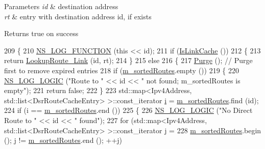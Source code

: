 \begin{DoxyParams}{Parameters}
{\em id} & destination address \\
\hline
{\em rt} & entry with destination address id, if exists \\
\hline
\end{DoxyParams}
\begin{DoxyReturn}{Returns}
true on success 
\end{DoxyReturn}

\begin{DoxyCode}
209 \{
210   \hyperlink{log-macros-disabled_8h_a90b90d5bad1f39cb1b64923ea94c0761}{NS\_LOG\_FUNCTION} (\textcolor{keyword}{this} << \textcolor{keywordtype}{id});
211   \textcolor{keywordflow}{if} (\hyperlink{classns3_1_1dsr_1_1DsrRouteCache_a3ec7cfaaf07c337cf71aa21793059293}{IsLinkCache} ())
212     \{
213       \textcolor{keywordflow}{return} \hyperlink{classns3_1_1dsr_1_1DsrRouteCache_ac9fcf2d3676a0e05cd567988cb29fe5a}{LookupRoute\_Link} (\textcolor{keywordtype}{id}, rt);
214     \}
215   \textcolor{keywordflow}{else}
216     \{
217       \hyperlink{classns3_1_1dsr_1_1DsrRouteCache_a33ac58361cc0e1cbe1b561db26f5dc82}{Purge} ();  \textcolor{comment}{// Purge first to remove expired entries}
218       \textcolor{keywordflow}{if} (\hyperlink{classns3_1_1dsr_1_1DsrRouteCache_a8d3530713c7152dbe42d0b616d9c1d96}{m\_sortedRoutes}.empty ())
219         \{
220           \hyperlink{group__logging_ga88acd260151caf2db9c0fc84997f45ce}{NS\_LOG\_LOGIC} (\textcolor{stringliteral}{"Route to "} << \textcolor{keywordtype}{id} << \textcolor{stringliteral}{" not found; m\_sortedRoutes is empty"});
221           \textcolor{keywordflow}{return} \textcolor{keyword}{false};
222         \}
223       std::map<Ipv4Address, std::list<DsrRouteCacheEntry> >::const\_iterator \hyperlink{bernuolliDistribution_8m_a6f6ccfcf58b31cb6412107d9d5281426}{i} = 
      \hyperlink{classns3_1_1dsr_1_1DsrRouteCache_a8d3530713c7152dbe42d0b616d9c1d96}{m\_sortedRoutes}.find (\textcolor{keywordtype}{id});
224       \textcolor{keywordflow}{if} (i == \hyperlink{classns3_1_1dsr_1_1DsrRouteCache_a8d3530713c7152dbe42d0b616d9c1d96}{m\_sortedRoutes}.end ())
225         \{
226           \hyperlink{group__logging_ga88acd260151caf2db9c0fc84997f45ce}{NS\_LOG\_LOGIC} (\textcolor{stringliteral}{"No Direct Route to "} << \textcolor{keywordtype}{id} << \textcolor{stringliteral}{" found"});
227           \textcolor{keywordflow}{for} (std::map<Ipv4Address, std::list<DsrRouteCacheEntry> >::const\_iterator j =
228                  \hyperlink{classns3_1_1dsr_1_1DsrRouteCache_a8d3530713c7152dbe42d0b616d9c1d96}{m\_sortedRoutes}.begin (); j != \hyperlink{classns3_1_1dsr_1_1DsrRouteCache_a8d3530713c7152dbe42d0b616d9c1d96}{m\_sortedRoutes}.end (); ++j)

\end{DoxyCode}

